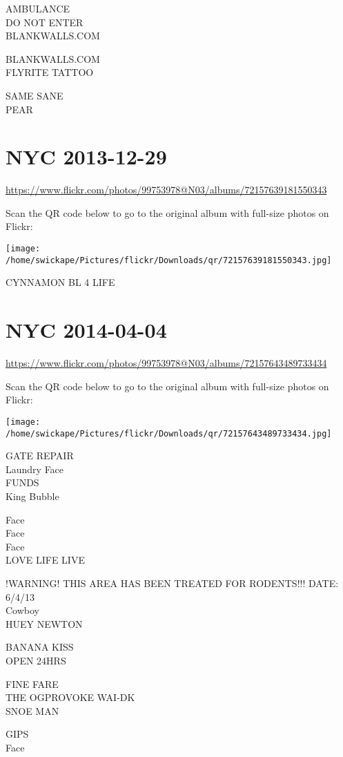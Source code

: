 \documentclass[10pt,letterpaper]{article}
\begin{document}
AMBULANCE\\
DO NOT ENTER\\
BLANKWALLS.COM

BLANKWALLS.COM\\
FLYRITE TATTOO

SAME SANE\\
PEAR
\pagebreak

\section*{NYC 2013-12-29}

\url{https://www.flickr.com/photos/99753978@N03/albums/72157639181550343}

Scan the QR code below to go to the original album with full-size photos on Flickr:

\texttt{[image: /home/swickape/Pictures/flickr/Downloads/qr/72157639181550343.jpg]}
\pagebreak

CYNNAMON BL 4 LIFE
\pagebreak

\section*{NYC 2014-04-04}

\url{https://www.flickr.com/photos/99753978@N03/albums/72157643489733434}

Scan the QR code below to go to the original album with full-size photos on Flickr:

\texttt{[image: /home/swickape/Pictures/flickr/Downloads/qr/72157643489733434.jpg]}
\pagebreak

GATE REPAIR\\
Laundry Face\\
FUNDS\\
King Bubble

Face\\
Face\\
Face\\
LOVE LIFE LIVE

!WARNING! THIS AREA HAS BEEN TREATED FOR RODENTS!!! DATE: 6/4/13\\
Cowboy\\
HUEY NEWTON

BANANA KISS\\
OPEN 24HRS

FINE FARE\\
THE OGPROVOKE WAI{-}DK\\
SNOE MAN

GIPS\\
Face
\pagebreak
\end{document}
